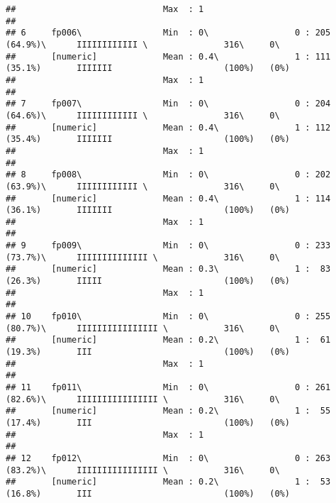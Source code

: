 \documentclass[]{article}
\begin{document}
\begin{verbatim}
##                             Max  : 1                                                                                       
## 
## 6     fp006\                Min  : 0\                 0 : 205 (64.9%)\      IIIIIIIIIIII \               316\     0\       
##       [numeric]             Mean : 0.4\               1 : 111 (35.1%)       IIIIIII                      (100%)   (0%)     
##                             Max  : 1                                                                                       
## 
## 7     fp007\                Min  : 0\                 0 : 204 (64.6%)\      IIIIIIIIIIII \               316\     0\       
##       [numeric]             Mean : 0.4\               1 : 112 (35.4%)       IIIIIII                      (100%)   (0%)     
##                             Max  : 1                                                                                       
## 
## 8     fp008\                Min  : 0\                 0 : 202 (63.9%)\      IIIIIIIIIIII \               316\     0\       
##       [numeric]             Mean : 0.4\               1 : 114 (36.1%)       IIIIIII                      (100%)   (0%)     
##                             Max  : 1                                                                                       
## 
## 9     fp009\                Min  : 0\                 0 : 233 (73.7%)\      IIIIIIIIIIIIII \             316\     0\       
##       [numeric]             Mean : 0.3\               1 :  83 (26.3%)       IIIII                        (100%)   (0%)     
##                             Max  : 1                                                                                       
## 
## 10    fp010\                Min  : 0\                 0 : 255 (80.7%)\      IIIIIIIIIIIIIIII \           316\     0\       
##       [numeric]             Mean : 0.2\               1 :  61 (19.3%)       III                          (100%)   (0%)     
##                             Max  : 1                                                                                       
## 
## 11    fp011\                Min  : 0\                 0 : 261 (82.6%)\      IIIIIIIIIIIIIIII \           316\     0\       
##       [numeric]             Mean : 0.2\               1 :  55 (17.4%)       III                          (100%)   (0%)     
##                             Max  : 1                                                                                       
## 
## 12    fp012\                Min  : 0\                 0 : 263 (83.2%)\      IIIIIIIIIIIIIIII \           316\     0\       
##       [numeric]             Mean : 0.2\               1 :  53 (16.8%)       III                          (100%)   (0%)     

\end{verbatim}
\end{document}
